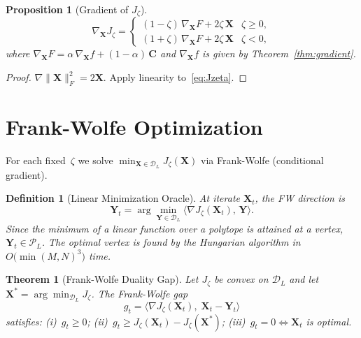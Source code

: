 \documentclass[conference]{IEEEtran}
\newtheorem{proposition}{Proposition}
\newtheorem{theorem}{Theorem}
\newtheorem{definition}{Definition}
\begin{document}
\begin{proposition}[Gradient of $J_\zeta$]
\label{prop:grad-Jzeta}
\begin{equation}
\nabla_{\!\mathbf{X}} J_\zeta\!=\!
\begin{cases}
(1 - \zeta)\,\nabla_{\!\mathbf{X}} F + 2\zeta\,\mathbf{X}
  & \zeta \geq 0, \\[4pt]
(1 + \zeta)\,\nabla_{\!\mathbf{X}} F + 2\zeta\,\mathbf{X}
  & \zeta < 0,
\end{cases}
\label{eq:grad-Jzeta}
\end{equation}
where\;
$\nabla_{\!\mathbf{X}} F
  = \alpha\,\nabla_{\!\mathbf{X}} f + (1\!-\!\alpha)\,\mathbf{C}$\;
and $\nabla_{\!\mathbf{X}} f$ is given by
Theorem~\ref{thm:gradient}.
\end{proposition}

\begin{proof}
$\nabla\|\mathbf{X}\|_F^2 = 2\mathbf{X}$.
Apply linearity to~\eqref{eq:Jzeta}.
\end{proof}


\section{Frank-Wolfe Optimization}
\label{sec:frank-wolfe}

For each fixed~$\zeta$ we solve
$\min_{\mathbf{X} \in \mathcal{D}_L} J_\zeta(\mathbf{X})$
via Frank-Wolfe (conditional gradient).

\begin{definition}[Linear Minimization Oracle]
\label{def:lmo}
At iterate $\mathbf{X}_t$, the FW direction is
\begin{equation}
\mathbf{Y}_t
  = \arg\min_{\mathbf{Y} \in \mathcal{D}_L}
    \bigl\langle \nabla J_\zeta(\mathbf{X}_t),\,\mathbf{Y}\bigr\rangle.
\label{eq:lmo}
\end{equation}
Since the minimum of a linear function over a polytope
is attained at a vertex, $\mathbf{Y}_t \!\in\! \mathcal{P}_L$.
The optimal vertex is found by the Hungarian algorithm
in $O\!\bigl(\min(M,N)^3\bigr)$ time.
\end{definition}

\begin{theorem}[Frank-Wolfe Duality Gap]
\label{thm:fw-gap}
Let $J_\zeta$ be convex on $\mathcal{D}_L$ and let
$\mathbf{X}^{\!*} = \arg\min_{\mathcal{D}_L} J_\zeta$.
The Frank-Wolfe gap
\begin{equation}
g_t
  = \bigl\langle \nabla J_\zeta(\mathbf{X}_t),\;
    \mathbf{X}_t - \mathbf{Y}_t \bigr\rangle
\label{eq:fw-gap}
\end{equation}
satisfies:\;
\textup{(i)}~$g_t \geq 0$;\;
\textup{(ii)}~$g_t \geq J_\zeta(\mathbf{X}_t) - J_\zeta(\mathbf{X}^{\!*})$;\;
\textup{(iii)}~$g_t = 0 \Leftrightarrow \mathbf{X}_t$ is optimal.
\end{theorem}
\end{document}
